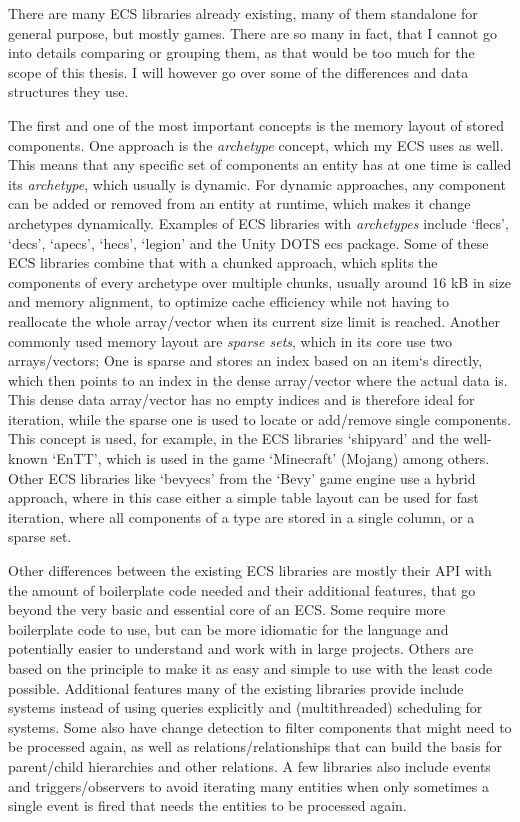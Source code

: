 There are many ECS libraries already existing, many of them standalone for general purpose, but mostly games. There are so many in fact, that I cannot go into details comparing or grouping them, as that would be too much for the scope of this thesis. I will however go over some of the differences and data structures they use.

The first and one of the most important concepts is the memory layout of stored components. One approach is the \textit{archetype} concept, which my ECS uses as well. This means that any specific set of components an entity has at one time is called its \textit{archetype}, which usually is dynamic. For dynamic approaches, any component can be added or removed from an entity at runtime, which makes it change archetypes dynamically. Examples of ECS libraries with \textit{archetypes} include `flecs', `decs', `apecs', `hecs', `legion' and the Unity DOTS ecs package. Some of these ECS libraries combine that with a chunked approach, which splits the components of every archetype over multiple chunks, usually around 16 kB in size and memory alignment, to optimize cache efficiency while not having to reallocate the whole array/vector when its current size limit is reached. Another commonly used memory layout are \textit{sparse sets}, which in its core use two arrays/vectors; One is sparse and stores an index based on an item`s directly, which then points to an index in the dense array/vector where the actual data is. This dense data array/vector has no empty indices and is therefore ideal for iteration, while the sparse one is used to locate or add/remove single components. This concept is used, for example, in the ECS libraries `shipyard' and the well-known `EnTT', which is used in the game `Minecraft' (Mojang) among others. Other ECS libraries like `bevy\textunderscore ecs' from the `Bevy' game engine use a hybrid approach, where in this case either a simple table layout can be used for fast iteration, where all components of a type are stored in a single column, or a sparse set.


Other differences between the existing ECS libraries are mostly their API with the amount of boilerplate code needed and their additional features, that go beyond the very basic and essential core of an ECS. Some require more boilerplate code to use, but can be more idiomatic for the language and potentially easier to understand and work with in large projects. Others are based on the principle to make it as easy and simple to use with the least code possible. Additional features many of the existing libraries provide include systems instead of using queries explicitly and (multithreaded) scheduling for systems. Some also have change detection to filter components that might need to be processed again, as well as relations/relationships that can build the basis for parent/child hierarchies and other relations. A few libraries also include events and triggers/observers to avoid iterating many entities when only sometimes a single event is fired that needs the entities to be processed again.

